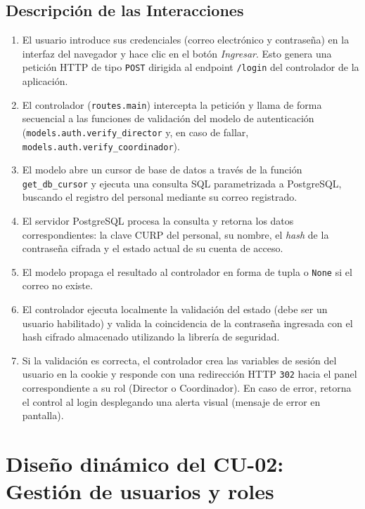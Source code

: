 \subsection{Descripción de las Interacciones}
\begin{enumerate}
    \item El usuario introduce sus credenciales (correo electrónico y contraseña) en la interfaz del navegador y hace clic en el botón \textit{Ingresar}. Esto genera una petición HTTP de tipo \texttt{POST} dirigida al endpoint \texttt{/login} del controlador de la aplicación.
    \item El controlador (\texttt{routes.main}) intercepta la petición y llama de forma secuencial a las funciones de validación del modelo de autenticación (\texttt{models.auth.verify\_director} y, en caso de fallar, \texttt{models.auth.verify\_coordinador}).
    \item El modelo abre un cursor de base de datos a través de la función \texttt{get\_db\_cursor} y ejecuta una consulta SQL parametrizada a PostgreSQL, buscando el registro del personal mediante su correo registrado.
    \item El servidor PostgreSQL procesa la consulta y retorna los datos correspondientes: la clave CURP del personal, su nombre, el \textit{hash} de la contraseña cifrada y el estado actual de su cuenta de acceso.
    \item El modelo propaga el resultado al controlador en forma de tupla o \texttt{None} si el correo no existe.
    \item El controlador ejecuta localmente la validación del estado (debe ser un usuario habilitado) y valida la coincidencia de la contraseña ingresada con el hash cifrado almacenado utilizando la librería de seguridad.
    \item Si la validación es correcta, el controlador crea las variables de sesión del usuario en la cookie y responde con una redirección HTTP \texttt{302} hacia el panel correspondiente a su rol (Director o Coordinador). En caso de error, retorna el control al login desplegando una alerta visual (mensaje de error en pantalla).
\end{enumerate}

\section{Diseño dinámico del CU-02: Gestión de usuarios y roles}
\label{sec:disenoDinamicoCU02}

